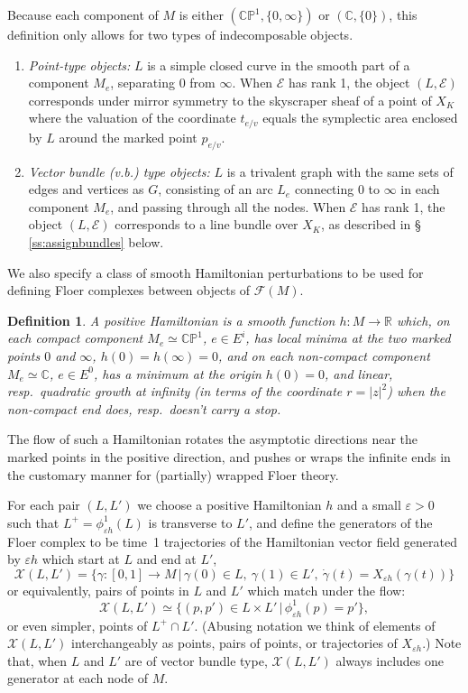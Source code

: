 \documentclass[11pt,leqno]{amsart}
\newtheorem{defi}[theo]{Definition}
\numberwithin{equation}{section}
\def\CP{\mathbb{CP}}
\def\R{\mathbb{R}}
\def\C{\mathbb{C}}
\def\F{{\mathcal F}}
\newcommand{\cE}{{\mathcal E}}
\newcommand{\cX}{{\mathcal X}}
\begin{document}
Because each component of $M$ is either $(\CP^1,\{0,\infty\})$ or
$(\C,\{0\})$, this definition only allows for two types of indecomposable objects.
\begin{enumerate}
\item {\em Point-type objects:} $L$ is a 
simple closed curve in the smooth part of a component $M_e$, separating $0$
from $\infty$. When $\cE$ has rank 1, the object $(L,\cE)$ corresponds under
mirror symmetry to the skyscraper sheaf of a point of $X_K$ where the
valuation of the coordinate $t_{e/v}$ equals the symplectic area enclosed
by $L$ around the marked point $p_{e/v}$.
\item {\em Vector bundle (v.b.) type objects:} 
$L$ is a trivalent graph with the same sets of edges and vertices as $G$,
consisting of an arc $L_e$ connecting $0$ to $\infty$ in each component $M_e$,
and passing through all the nodes. When $\cE$ has rank 1, the object
$(L,\cE)$ corresponds to a line bundle over $X_K$, as described in \S
\ref{ss:assignbundles} below.
\end{enumerate}

We also specify a class of
smooth Hamiltonian perturbations to be used for defining Floer complexes
between objects of $\F(M)$.

\begin{defi}
A {\em positive Hamiltonian} is a smooth function $h:M\to\R$ which, on each compact component $M_e\simeq
\CP^1$, $e\in E^i$, has local minima at the two marked points $0$ and $\infty$,
$h(0)=h(\infty)=0$, and on each non-compact component $M_e\simeq \C$, $e\in
E^0$, has a minimum at the origin $h(0)=0$, and linear, resp.\
quadratic growth at infinity (in terms of the coordinate $r=|z|^2$) when the 
non-compact end does, resp.\ doesn't carry a stop.
\end{defi}

The flow of such a
Hamiltonian rotates the asymptotic directions near the
marked points in the positive direction, and pushes or wraps the infinite
ends in the customary manner for (partially) wrapped Floer theory.

For each pair $(L,L')$ we choose a positive Hamiltonian $h$ and a small
$\varepsilon>0$ such that
$L^+=\phi^1_{\varepsilon h}(L)$ is transverse to $L'$, and define the generators
of the Floer complex to be time~1 trajectories of the Hamiltonian vector field
generated by $\varepsilon h$ which start at $L$ and end at $L'$,
\begin{equation}\label{eq:floergenerators}
\cX(L,L')=\{\gamma:[0,1]\to M\,|\,\gamma(0)\in L,\ \gamma(1)\in L',\ \dot\gamma(t)=X_{\varepsilon h}(\gamma(t))\}
\end{equation}
or equivalently, pairs of points in $L$ and $L'$ which match under the flow:
$$\cX(L,L')\simeq
\{(p,p')\in L\times L'\,|\,\phi^1_{\varepsilon h}(p)=p'\},$$
or even simpler, points of $L^+\cap L'$. (Abusing notation we think of elements of $\cX(L,L')$ interchangeably
as points, pairs of points, or trajectories of $X_{\varepsilon h}$.)
Note that, when $L$ and $L'$ are of vector bundle type, $\cX(L,L')$ always
includes one generator at each node of $M.$ 
\end{document}
